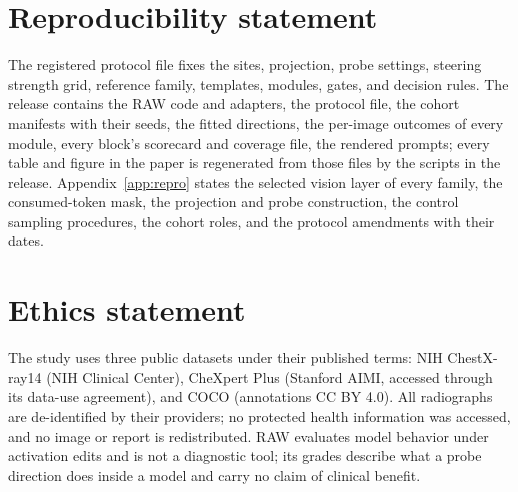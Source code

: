 \section*{Reproducibility statement}
The registered protocol file fixes the sites, projection, probe settings, steering strength grid, reference family, templates, modules, gates, and decision rules. The release contains the RAW code and adapters, the protocol file, the cohort manifests with their seeds, the fitted directions, the per-image outcomes of every module, every block's scorecard and coverage file, the rendered prompts; every table and figure in the paper is regenerated from those files by the scripts in the release. Appendix~\ref{app:repro} states the selected vision layer of every family, the consumed-token mask, the projection and probe construction, the control sampling procedures, the cohort roles, and the protocol amendments with their dates.

\section*{Ethics statement}
The study uses three public datasets under their published terms: NIH ChestX-ray14 (NIH Clinical Center), CheXpert Plus (Stanford AIMI, accessed through its data-use agreement), and COCO (annotations CC BY 4.0). All radiographs are de-identified by their providers; no protected health information was accessed, and no image or report is redistributed. RAW evaluates model behavior under activation edits and is not a diagnostic tool; its grades describe what a probe direction does inside a model and carry no claim of clinical benefit.
